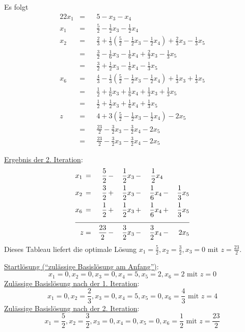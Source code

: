 \documentclass[10pt,a4paper,oneside,ngerman,numbers=noenddot]{scrartcl}
\begin{document}
		Es folgt
		\begin{alignat*}{2}
			2x_{1} &=&& 5 - x_{3} - x_{4} \\
			x_{1} &=&& \frac{5}{2} - \frac{1}{2}x_{3} - \frac{1}{2}x_{4} \\
			x_{2} &=&& \frac{2}{3} + \frac{1}{3}\left(\frac{5}{2} - \frac{1}{2}x_{3} - \frac{1}{2}x_{4}\right) + \frac{2}{3}x_{3} - \frac{1}{3}x_{5} \\
			&=&& \frac{3}{2} - \frac{1}{6}x_{3} - \frac{1}{6}x_{4} + \frac{2}{3}x_{3} - \frac{1}{3}x_{5} \\
			&=&& \frac{3}{2} + \frac{1}{2}x_{3} - \frac{1}{6}x_{4} - \frac{1}{3}x_{5} \\
			x_{6} &=&& \frac{4}{3} - \frac{1}{3}\left(\frac{5}{2} - \frac{1}{2}x_{3} - \frac{1}{2}x_{4}\right) + \frac{1}{3}x_{3} + \frac{1}{3}x_{5} \\
			&=&& \frac{1}{2} + \frac{1}{6}x_{3} + \frac{1}{6}x_{4} + \frac{1}{3}x_{3} + \frac{1}{3}x_{5} \\
			&=&& \frac{1}{2} + \frac{1}{2}x_{3} + \frac{1}{6}x_{4} + \frac{1}{3}x_{5} \\
			z &=&& 4 + 3\left(\frac{5}{2} - \frac{1}{2}x_{3} - \frac{1}{2}x_{4}\right) - 2x_{5} \\
			&=&& \frac{23}{2} - \frac{3}{2}x_{3} - \frac{3}{2}x_{4} - 2x_{5} \\
			&=&& \frac{23}{2} - \frac{3}{2}x_{3} - \frac{3}{2}x_{4} - 2x_{5}
		\end{alignat*}
		
		\underline{Ergebnis der 2. Iteration}:
		\begin{alignat*}{5}
			x_{1} \,&=&\, \frac{5}{2} \,&-&\, \frac{1}{2}x_{3} \,&-&\, \frac{1}{2}x_{4} && \\
			x_{2} \,&=&\, \frac{3}{2} \,&+&\, \frac{1}{2}x_{3} \,&-&\, \frac{1}{6}x_{4} \,&-&\, \frac{1}{3}x_{5} \\
			x_{6} \,&=&\, \frac{1}{2} \,&+&\, \frac{1}{2}x_{3} \,&+&\, \frac{1}{6}x_{4} \,&+&\, \frac{1}{3}x_{5} \\ \cline{1 - 9}
			z &=& \frac{23}{2} \,&-&\, \frac{3}{2}x_{3} \,&-&\, \frac{3}{2}x_{4} \,&-&\, 2x_{5}
		\end{alignat*}
		Dieses Tableau liefert die optimale Lösung $x_{1} = \frac{5}{2}, x_{2} = \frac{3}{2}, x_{3} = 0$ mit $z = \frac{23}{2}$.
		
		\underline{Startlösung ("`zulässige Basislösung am Anfang"')}:
		\[
			x_{1} = 0, x_{2} = 0, x_{3} = 0, x_{4} = 5, x_{5} = 2, x_{6} = 2  \text{ mit } z = 0
		\]
		\underline{Zulässige Basislösung nach der 1. Iteration}:
		\[
			x_{1} = 0, x_{2} = \frac{2}{3}, x_{3} = 0, x_{4} = 5, x_{5} = 0, x_{6} = \frac{4}{3} \text{ mit } z = 4
		\]
		\underline{Zulässige Basislösung nach der 2. Iteration}:
		\[
			x_{1} = \frac{5}{2}, x_{2} = \frac{3}{2}, x_{3} = 0, x_{4} = 0, x_{5} = 0, x_{6} = \frac{1}{2} \text{ mit } z = \frac{23}{2}
		\]
\end{document}

